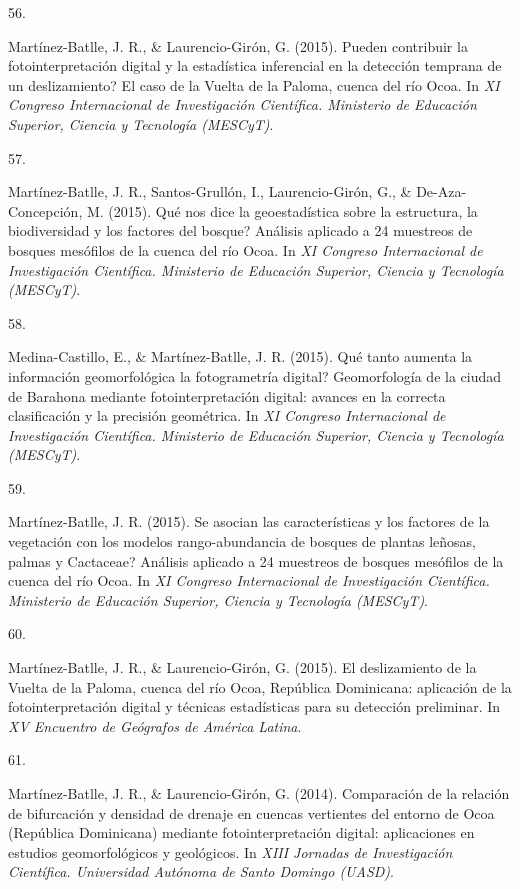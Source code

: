 \documentclass[10pt,a4paper,]{article}
\newlength{\cslhangindent}
\newlength{\csllabelwidth}
\newcommand{\CSLLeftMargin}[1]{\parbox[t]{\csllabelwidth}{\hfill #1~}}
\newcommand{\CSLRightInline}[1]{\parbox[t]{\linewidth - \cslhangindent - \csllabelwidth}{#1}\vspace{0.8ex}}
\begin{document}
\leavevmode\hypertarget{ref-Jose_Ramon_Martinez-Batlle_108053568}{}%
\CSLLeftMargin{56. }
\CSLRightInline{Martínez-Batlle, J. R., \& Laurencio-Girón, G. (2015).
Pueden contribuir la fotointerpretación digital y la estadística
inferencial en la detección temprana de un deslizamiento? El caso de la
Vuelta de la Paloma, cuenca del río Ocoa. In \emph{XI Congreso
Internacional de Investigación Científica. Ministerio de Educación
Superior, Ciencia y Tecnología (MESCyT)}.}

\leavevmode\hypertarget{ref-Jose_Ramon_Martinez-Batlle_108053371}{}%
\CSLLeftMargin{57. }
\CSLRightInline{Martínez-Batlle, J. R., Santos-Grullón, I.,
Laurencio-Girón, G., \& De-Aza-Concepción, M. (2015). Qué nos dice la
geoestadística sobre la estructura, la biodiversidad y los factores del
bosque? Análisis aplicado a 24 muestreos de bosques mesófilos de la
cuenca del río Ocoa. In \emph{XI Congreso Internacional de Investigación
Científica. Ministerio de Educación Superior, Ciencia y Tecnología
(MESCyT)}.}

\leavevmode\hypertarget{ref-Jose_Ramon_Martinez-Batlle_108046657}{}%
\CSLLeftMargin{58. }
\CSLRightInline{Medina-Castillo, E., \& Martínez-Batlle, J. R. (2015).
Qué tanto aumenta la información geomorfológica la fotogrametría
digital? Geomorfología de la ciudad de Barahona mediante
fotointerpretación digital: avances en la correcta clasificación y la
precisión geométrica. In \emph{XI Congreso Internacional de
Investigación Científica. Ministerio de Educación Superior, Ciencia y
Tecnología (MESCyT)}.}

\leavevmode\hypertarget{ref-Jose_Ramon_Martinez-Batlle_108050214}{}%
\CSLLeftMargin{59. }
\CSLRightInline{Martínez-Batlle, J. R. (2015). Se asocian las
características y los factores de la vegetación con los modelos
rango-abundancia de bosques de plantas leñosas, palmas y Cactaceae?
Análisis aplicado a 24 muestreos de bosques mesófilos de la cuenca del
río Ocoa. In \emph{XI Congreso Internacional de Investigación
Científica. Ministerio de Educación Superior, Ciencia y Tecnología
(MESCyT)}.}

\leavevmode\hypertarget{ref-Jose_Ramon_Martinez-Batlle_108053606}{}%
\CSLLeftMargin{60. }
\CSLRightInline{Martínez-Batlle, J. R., \& Laurencio-Girón, G. (2015).
El deslizamiento de la Vuelta de la Paloma, cuenca del río Ocoa,
República Dominicana: aplicación de la fotointerpretación digital y
técnicas estadísticas para su detección preliminar. In \emph{XV
Encuentro de Geógrafos de América Latina}.}

\leavevmode\hypertarget{ref-Jose_Ramon_Martinez-Batlle_108100939}{}%
\CSLLeftMargin{61. }
\CSLRightInline{Martínez-Batlle, J. R., \& Laurencio-Girón, G. (2014).
Comparación de la relación de bifurcación y densidad de drenaje en
cuencas vertientes del entorno de Ocoa (República Dominicana) mediante
fotointerpretación digital: aplicaciones en estudios geomorfológicos y
geológicos. In \emph{XIII Jornadas de Investigación Científica.
Universidad Autónoma de Santo Domingo (UASD)}.}
\end{document}
